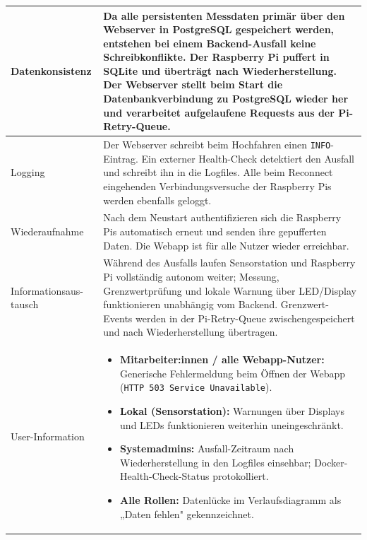 \documentclass[12pt,a4paper]{article}
\begin{document}
    \begin{tabularx}{\linewidth}{L X}
    \toprule
    Datenkonsistenz &
    Da alle persistenten Messdaten primär über den Webserver in PostgreSQL gespeichert
    werden, entstehen bei einem Backend-Ausfall keine Schreibkonflikte. Der Raspberry Pi
    puffert in SQLite und überträgt nach Wiederherstellung. Der Webserver stellt beim Start
    die Datenbankverbindung zu PostgreSQL wieder her und verarbeitet aufgelaufene Requests
    aus der Pi-Retry-Queue. \\
    \midrule
    Logging &
    Der Webserver schreibt beim Hochfahren einen \texttt{INFO}-Eintrag.
    Ein externer Health-Check detektiert den Ausfall und schreibt ihn in die Logfiles.
    Alle beim Reconnect eingehenden Verbindungsversuche der Raspberry Pis werden ebenfalls geloggt. \\
    \midrule
    Wiederaufnahme &
    Nach dem Neustart authentifizieren sich die Raspberry Pis automatisch erneut
    und senden ihre gepufferten Daten. Die Webapp ist für alle Nutzer wieder erreichbar. \\
    \midrule
    Informationsaus-
    tausch &
    Während des Ausfalls laufen Sensorstation und Raspberry Pi vollständig autonom weiter;
    Messung, Grenzwertprüfung und lokale Warnung über LED/Display funktionieren
    unabhängig vom Backend. Grenzwert-Events werden in der Pi-Retry-Queue
    zwischengespeichert und nach Wiederherstellung übertragen. \\
    \midrule
    User-Information &
    \begin{minipage}[t]{\linewidth}
        \begin{itemize}[leftmargin=1.2em, itemsep=2pt, topsep=0pt]
            \item \textbf{Mitarbeiter:innen / alle Webapp-Nutzer:} Generische Fehlermeldung
            beim Öffnen der Webapp (\texttt{HTTP 503 Service Unavailable}).
            \item \textbf{Lokal (Sensorstation):} Warnungen über Displays und LEDs
            funktionieren weiterhin uneingeschränkt.
            \item \textbf{Systemadmins:} Ausfall-Zeitraum nach Wiederherstellung in den
            Logfiles einsehbar; Docker-Health-Check-Status protokolliert.
            \item \textbf{Alle Rollen:} Datenlücke im Verlaufsdiagramm als
            „Daten fehlen" gekennzeichnet.
        \end{itemize}
    \end{minipage} \\
    \bottomrule
    \end{tabularx}
\end{document}
